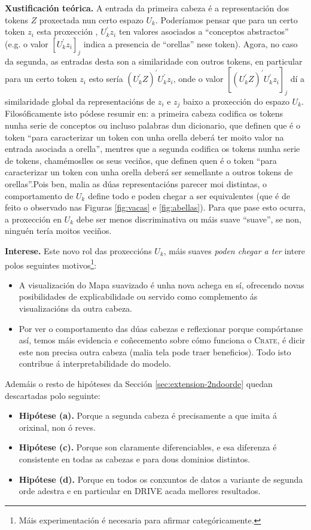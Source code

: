 \textbf{Xustificación teórica.} A entrada da primeira cabeza é a representación dos \glspl{token} $Z$ proxectada nun certo espazo $U_k$. Poderíamos pensar que para un certo \gls{token} $z_i$ esta proxección , $U_k^{'}z_i$ ten valores asociados a ``conceptos abstractos'' (e.g. o valor $[U_k^{'}z_i]_j$ indica a presencia de ``orellas'' nese \gls{token}). Agora, no caso da segunda, as entradas desta son a similaridade con outros \glspl{token}, en particular para un certo \gls{token} $z_i$ esto sería $(U_k^{'}Z)^{'}U_k^{'} z_i$, onde o valor $[(U_k^{'}Z)^{'}U_k^{'} z_i]_j$ dí a similaridade global da representacións de $z_i$ e $z_j$ baixo a proxección do espazo $U_k$. Filosóficamente isto pódese resumir en: a primeira cabeza codifica os \glspl{token} nunha serie de conceptos ou incluso palabras dun dicionario, que definen que é o \gls{token} ``para caracterizar un \gls{token} con unha orella deberá ter moito valor na entrada asociada a orella'', mentres que a segunda codifica os \glspl{token} nunha serie de \glspl{token}, chamémoslles os seus veciños, que definen quen é o \gls{token} ``para caracterizar un \gls{token} con unha orella deberá ser semellante a outros \glspl{token} de orellas''.Pois ben, malia as dúas representacións parecer moi distintas, o comportamento de $U_k$ define todo e poden chegar a ser equivalentes (que é de feito o observado nas Figuras \ref{fig:vacas} e \ref{fig:abellas}). Para que pase esto ocurra, a proxección en $U_k$ debe ser menos discriminativa ou máis suave ``suave'', se non, ninguén tería moitos veciños.

\textbf{Interese.} Este novo rol das proxeccións $U_k$, máis suaves \emph{poden chegar a ter} intere polos seguintes motivos\footnote{Máis experimentación é necesaria para afirmar categóricamente.}:
\begin{itemize}
				\item A visualización do Mapa suavizado é unha nova achega en sí, ofrecendo novas posibilidades de \gls{explicabilidade} ou servido como complemento ás visualizacións da outra cabeza.
				\item Por ver o comportamento das dúas cabezas e reflexionar porque compórtanse así, temos máis evidencia e coñecemento sobre cómo funciona o \textsc{Crate}, é dicir este non precisa outra cabeza (malia tela pode traer beneficios). Todo isto contribue á \gls{interpretabilidade} do modelo.
\end{itemize}

Ademáis o resto de hipóteses da Sección \ref{sec:extension-2ndoorde} quedan descartadas polo seguinte:
\begin{itemize}
				\item \textbf{Hipótese (a).} Porque a segunda cabeza é precisamente a que imita á orixinal, non ó reves.
				\item \textbf{Hipótese (c).} Porque son claramente diferenciables, e esa diferenza é consistente en todas as cabezas e para dous dominios distintos.
				\item \textbf{Hipótese (d).} Porque en todos os conxuntos de datos a variante de segunda orde adestra e en particular en DRIVE acada mellores resultados.
\end{itemize}

